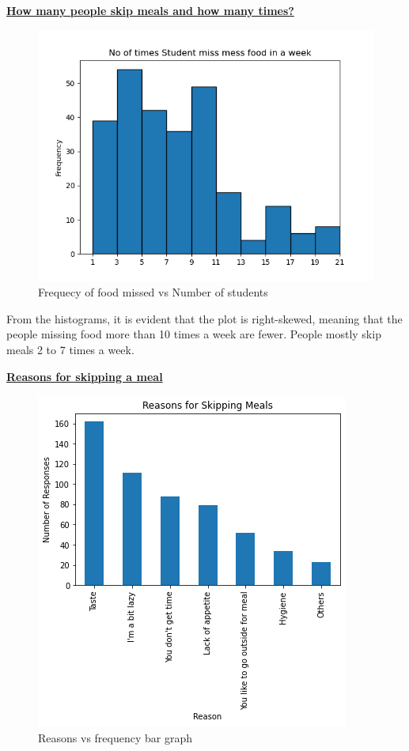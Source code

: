 \documentclass{article}
\begin{document}
\centerline{\underline{\bfseries{How many people skip meals and how many times?}}}
\begin{figure}[H]
    \centering
    \includegraphics[scale = 0.7]{histogram_meal_skip.png}
    \caption{Frequecy of food missed vs Number of students}  
    \label{fig:histogram_meal_skip}
\end{figure}
From the histograms, it is evident that the plot is right-skewed, meaning that the people missing food more than 10 times a week are fewer. People mostly skip meals 2 to 7 times a week.\\
\centerline{\underline{\bfseries{Reasons for skipping a meal}}}
\begin{figure}[H]
    \centering
    \includegraphics[scale = 0.7]{bar_reasons.png}
    \caption{Reasons vs frequency bar graph}  
    \label{fig:bar_reasons}
\end{figure}
\end{document}
